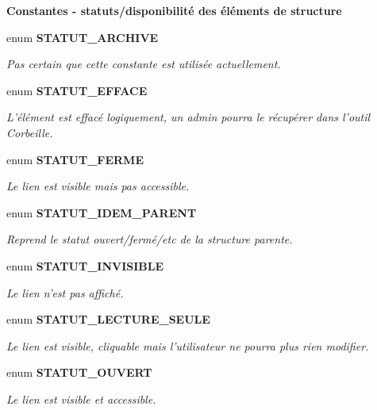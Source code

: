 \begin{Indent}{\bf Constantes - statuts/disponibilité des éléments de structure}\par
\begin{CompactItemize}
\item 
enum {\bf STATUT\_\-ARCHIVE} 
\begin{CompactList}\small\item\em Pas certain que cette constante est utilisée actuellement. \item\end{CompactList}\item 
enum {\bf STATUT\_\-EFFACE} 
\begin{CompactList}\small\item\em L'élément est effacé logiquement, un admin pourra le récupérer dans l'outil Corbeille. \item\end{CompactList}\item 
enum {\bf STATUT\_\-FERME} 
\begin{CompactList}\small\item\em Le lien est visible mais pas accessible. \item\end{CompactList}\item 
enum {\bf STATUT\_\-IDEM\_\-PARENT} 
\begin{CompactList}\small\item\em Reprend le statut ouvert/fermé/etc de la structure parente. \item\end{CompactList}\item 
enum {\bf STATUT\_\-INVISIBLE} 
\begin{CompactList}\small\item\em Le lien n'est pas affiché. \item\end{CompactList}\item 
enum {\bf STATUT\_\-LECTURE\_\-SEULE} 
\begin{CompactList}\small\item\em Le lien est visible, cliquable mais l'utilisateur ne pourra plus rien modifier. \item\end{CompactList}\item 
enum {\bf STATUT\_\-OUVERT} 
\begin{CompactList}\small\item\em Le lien est visible et accessible. \item\end{CompactList}\end{CompactItemize}
\end{Indent}
